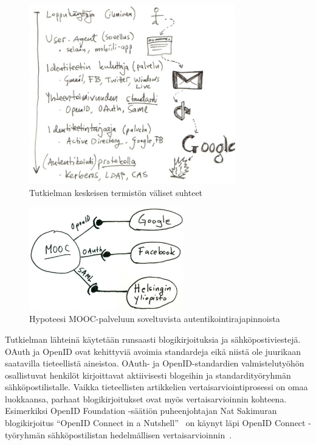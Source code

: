 \documentclass[finnish,gradu]{tktltiki}
\begin{document}
  \begin{figure}[h!]
    \centering
    \includegraphics[width=0.8\textwidth]{images/auth_yleiskuva.jpg}
    \caption{Tutkielman keskeisen termistön väliset suhteet}
    \label{fig:yleiskuva_termien_suhteista}
  \end{figure}

  \begin{figure}
    \centering
    \includegraphics[width=0.6\textwidth]{images/mooc-autentikointirajapinnat.jpg}
    \caption{Hypoteesi MOOC-palveluun soveltuvista autentikointirajapinnoista}
    \label{fig:mooc-autentikointirajapinnat}
  \end{figure}

  Tutkielman lähteinä käytetään runsaasti blogikirjoituksia ja sähköpostiviestejä. OAuth ja OpenID ovat kehittyviä avoimia standardeja eikä niistä ole juurikaan saatavilla tieteellistä aineistoa. OAuth- ja OpenID-standardien valmistelutyöhön osallistuvat henkilöt kirjoittavat aktiivisesti blogeihin ja standardityöryhmän sähköpostilistalle. Vaikka tieteellisten artikkelien vertaisarviointiprosessi on omaa luokkaansa, parhaat blogikirjoitukset ovat myös vertaisarvioinnin kohteena. Esimerkiksi OpenID Foundation -säätiön puheenjohtajan Nat Sakimuran blogikirjoitus ``OpenID Connect in a Nutshell''~\cite{sakimura_openid_c_nutshell_2012} on käynyt läpi OpenID Connect -työryhmän sähköpostilistan hedelmällisen vertaisarvioinnin~\cite{openid_c_nutshell_peer_review_1_2012, openid_c_nutshell_peer_review_2_2012}.
\end{document}
